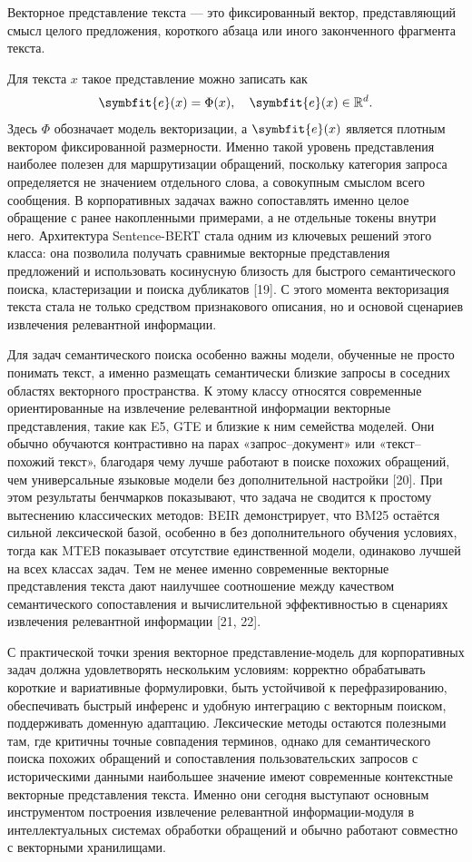 \documentclass[14pt,a4paper]{extarticle}
\numberwithin{figure}{section}
\numberwithin{table}{section}
\begin{document}
Векторное представление текста --- это фиксированный вектор, представляющий смысл
целого предложения, короткого абзаца или иного законченного фрагмента
текста.

Для текста \(x\) такое представление можно записать как
\begin{equation}
\symbfit{e}(x)=\Phi(x),\quad \symbfit{e}(x)\in\mathbb{R}^{d}.
\label{eq:sentence-embedding-intro}
\end{equation}
Здесь \(\Phi\) обозначает модель векторизации, а \(\symbfit{e}(x)\) является плотным вектором фиксированной размерности.
 Именно такой уровень представления наиболее полезен для
маршрутизации обращений, поскольку категория запроса определяется не
значением отдельного слова, а совокупным смыслом всего сообщения. В
корпоративных задачах важно сопоставлять именно целое обращение с ранее
накопленными примерами, а не отдельные токены внутри него. Архитектура
Sentence-BERT стала одним из ключевых решений этого класса: она
позволила получать сравнимые векторные представления предложений и
использовать косинусную близость для быстрого семантического поиска,
кластеризации и поиска дубликатов [19]. С этого момента векторизация текста
стала не только средством признакового описания, но и основой
сценариев извлечения релевантной информации.

Для задач семантического поиска особенно важны модели, обученные не
просто понимать текст, а именно размещать семантически близкие запросы в
соседних областях векторного пространства. К этому классу относятся
современные ориентированные на извлечение релевантной информации векторные представления, такие как E5, GTE и
близкие к ним семейства моделей. Они обычно обучаются контрастивно на
парах «запрос--документ» или «текст--похожий текст», благодаря чему
лучше работают в поиске похожих обращений, чем универсальные языковые
модели без дополнительной настройки [20]. При этом результаты бенчмарков
показывают, что задача не сводится к простому вытеснению классических
методов: BEIR демонстрирует, что BM25 остаётся сильной лексической
базой, особенно в без дополнительного обучения условиях, тогда как MTEB показывает
отсутствие единственной модели, одинаково лучшей на всех классах задач.
Тем не менее именно современные векторные представления текста дают наилучшее
соотношение между качеством семантического сопоставления и
вычислительной эффективностью в сценариях извлечения релевантной информации [21, 22].

С практической точки зрения векторное представление-модель для корпоративных задач
должна удовлетворять нескольким условиям: корректно обрабатывать
короткие и вариативные формулировки, быть устойчивой к перефразированию,
обеспечивать быстрый инференс и удобную интеграцию с векторным поиском,
поддерживать доменную адаптацию. Лексические методы остаются полезными
там, где критичны точные совпадения терминов, однако для семантического
поиска похожих обращений и сопоставления пользовательских запросов с
историческими данными наибольшее значение имеют современные контекстные
векторные представления текста. Именно они сегодня выступают основным инструментом
построения извлечение релевантной информации-модуля в интеллектуальных системах обработки
обращений и обычно работают совместно с векторными хранилищами.
\end{document}
